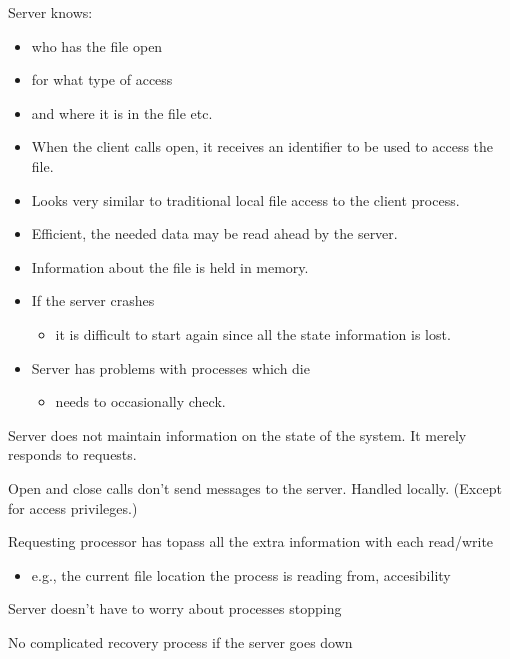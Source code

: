 \begin{slide}


    Server knows:
    \begin{itemize}
        \item who has the file open
        \item for what type of access
        \item and where it is in the file etc.
        \item When the client calls open, it receives an identifier to be used to access the file.
        \item Looks very similar to traditional local file access to the client process.
        \item Efficient, the needed data may be read ahead by the server.
        \item Information about the file is held in memory.
        \item If the server crashes
        \begin{itemize}
            \item it is difficult to start again since all the state information is lost.
        \end{itemize}
        \item Server has problems with processes which die
        \begin{itemize}
            \item needs to occasionally check.
        \end{itemize}
    \end{itemize}

\end{slide}

\begin{slide}


    Server does not maintain information on the state of the system. It merely responds to requests.
    \bigskip

    Open and close calls don’t send messages to the server. Handled locally. (Except for access privileges.)
    \bigskip

    Requesting processor has topass all the extra information with each read/write
    \begin{itemize}
        \item e.g., the current file location the process is reading from, accesibility
    \end{itemize}
    \bigskip

    Server doesn't have to worry about processes stopping
    \bigskip

    No complicated recovery process if the server goes down
    
\end{slide}
    

